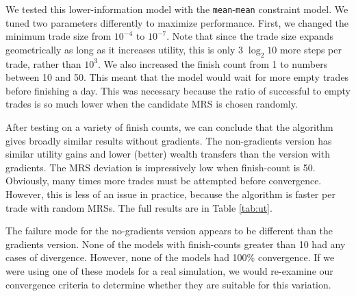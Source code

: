 \documentclass[12pt,a4paper,titlepage]{article}
\newcommand{\co}[1]{\texttt{#1}}
\begin{document}
We tested this lower-information model with the \co{mean}-\co{mean} constraint model.
We tuned two parameters differently to maximize performance. 
First, we changed the minimum trade size from $10^{-4}$ to $10^{-7}$.
Note that since the trade size expands geometrically as long as it increases utility, this is only $3 \; \log_2 10$ more steps per trade, rather than $10^3$.
We also increased the finish count from 1 to numbers between 10 and 50.
This meant that the model would wait for more empty trades before finishing a day.
This was necessary because the ratio of successful to empty trades is so much lower when the candidate MRS is chosen randomly.


After testing on a variety of finish counts, we can conclude that the algorithm gives broadly similar results without gradients. 
The non-gradients version has similar utility gains and lower (better) wealth transfers than the version with gradients.
The MRS deviation is impressively low when finish-count is 50.
Obviously, many times more trades must be attempted before convergence.
However, this is less of an issue in practice, because the algorithm is faster per trade with random MRSs.
The full results are in Table \ref{tab:ut}.

The failure mode for the no-gradients version appears to be different than the gradients version.
None of the models with finish-counts greater than 10 had any cases of divergence.
However, none of the models had 100\% convergence.
If we were using one of these models for a real simulation, we would re-examine our convergence criteria to determine whether they are suitable for this variation.
\end{document}
